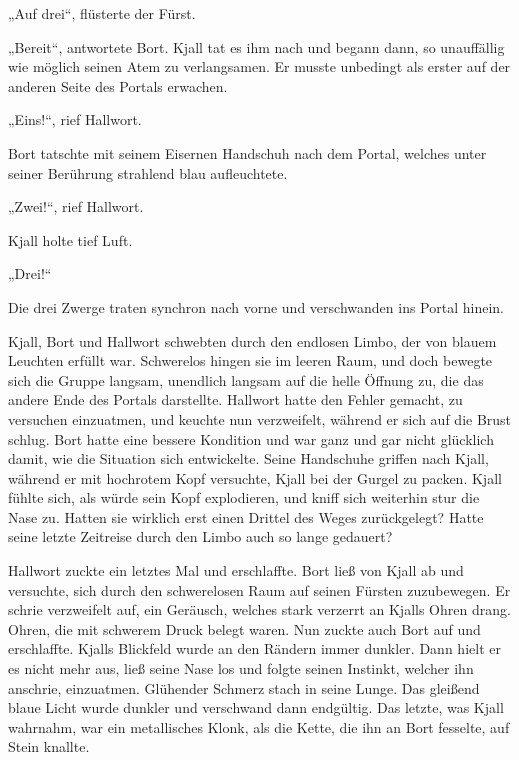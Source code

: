 „Auf drei“, flüsterte der Fürst.

„Bereit“, antwortete Bort. Kjall tat es ihm nach und begann dann, so unauffällig wie möglich seinen Atem zu verlangsamen. Er musste unbedingt als erster auf der anderen Seite des Portals erwachen.

„Eins!“, rief Hallwort.

Bort tatschte mit seinem Eisernen Handschuh nach dem Portal, welches unter seiner Berührung strahlend blau aufleuchtete.

„Zwei!“, rief Hallwort.

Kjall holte tief Luft.

„Drei!“

Die drei Zwerge traten synchron nach vorne und verschwanden ins Portal hinein.



\trennzeichen



Kjall, Bort und Hallwort schwebten durch den endlosen Limbo, der von blauem Leuchten erfüllt war. Schwerelos hingen sie im leeren Raum, und doch bewegte sich die Gruppe langsam, unendlich langsam auf die helle Öffnung zu, die das andere Ende des Portals darstellte. Hallwort hatte den Fehler gemacht, zu versuchen einzuatmen, und keuchte nun verzweifelt, während er sich auf die Brust schlug. Bort hatte eine bessere Kondition und war ganz und gar nicht glücklich damit, wie die Situation sich entwickelte. Seine Handschuhe griffen nach Kjall, während er mit hochrotem Kopf versuchte, Kjall bei der Gurgel zu packen. Kjall fühlte sich, als würde sein Kopf explodieren, und kniff sich weiterhin stur die Nase zu. Hatten sie wirklich erst einen Drittel des Weges zurückgelegt? Hatte seine letzte Zeitreise durch den Limbo auch so lange gedauert?

Hallwort zuckte ein letztes Mal und erschlaffte. Bort ließ von Kjall ab und versuchte, sich durch den schwerelosen Raum auf seinen Fürsten zuzubewegen. Er schrie verzweifelt auf, ein Geräusch, welches stark verzerrt an Kjalls Ohren drang. Ohren, die mit schwerem Druck belegt waren. Nun zuckte auch Bort auf und erschlaffte. Kjalls Blickfeld wurde an den Rändern immer dunkler. Dann hielt er es nicht mehr aus, ließ seine Nase los und folgte seinen Instinkt, welcher ihn anschrie, einzuatmen. Glühender Schmerz stach in seine Lunge. Das gleißend blaue Licht wurde dunkler und verschwand dann endgültig. Das letzte, was Kjall wahrnahm, war ein metallisches Klonk, als die Kette, die ihn an Bort fesselte, auf Stein knallte.



